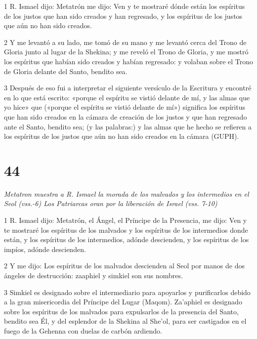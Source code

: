 \par 1 R. Ismael dijo: Metatrón me dijo: Ven y te mostraré dónde están los espíritus de los justos que han sido creados y han regresado, y los espíritus de los justos que aún no han sido creados.

\par 2 Y me levantó a su lado, me tomó de su mano y me levantó cerca del Trono de Gloria junto al lugar de la Shekina; y me reveló el Trono de Gloria, y me mostró los espíritus que habían sido creados y habían regresado: y volaban sobre el Trono de Gloria delante del Santo, bendito sea.

\par 3 Después de eso fui a interpretar el siguiente versículo de la Escritura y encontré en lo que está escrito: «porque el espíritu se vistió delante de mí, y las almas que yo hice» que («porque el espíritu se vistió delante de mí») significa los espíritus que han sido creados en la cámara de creación de los justos y que han regresado ante el Santo, bendito sea; (y las palabras:) y las almas que he hecho se refieren a los espíritus de los justos que aún no han sido creados en la cámara (GUPH).


\chapter{44}

\par \textit{Metatron muestra a R. Ismael la morada de los malvados y los intermedios en el Seol (vss.-6) Los Patriarcas oran por la liberación de Israel (vss. 7-10)}

\par 1 R. Ismael dijo: Metatrón, el Ángel, el Príncipe de la Presencia, me dijo: Ven y te mostraré los espíritus de los malvados y los espíritus de los intermedios donde están, y los espíritus de los intermedios, adónde descienden, y los espíritus de los impíos, adónde descienden.

\par 2 Y me dijo: Los espíritus de los malvados descienden al Seol por manos de dos ángeles de destrucción: zaaphiel y simkiel son sus nombres.

\par 3 Simkiel es designado sobre el intermediario para apoyarlos y purificarlos debido a la gran misericordia del Príncipe del Lugar (Maqom). Za'aphiel es designado sobre los espíritus de los malvados para expulsarlos de la presencia del Santo, bendito sea Él, y del esplendor de la Shekina al She'ol, para ser castigados en el fuego de la Gehenna con duelas de carbón ardiendo.


